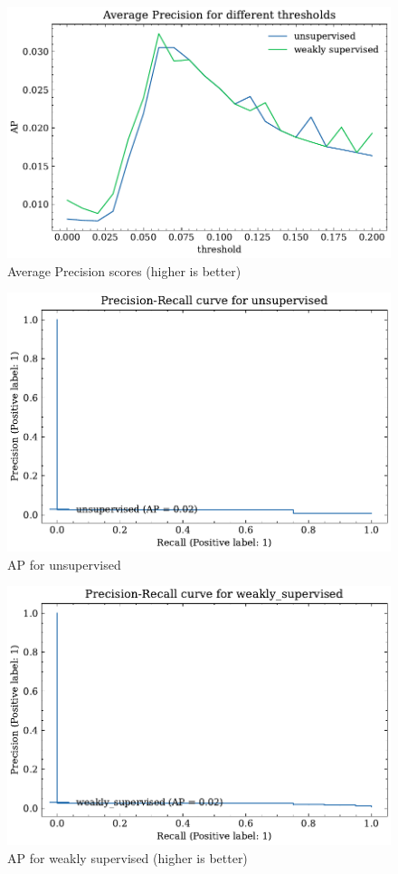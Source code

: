 \begin{figure}[htbp]
  \centering
  \includegraphics{5Results/figs/bsle/average_precision_score_for_thresholds.pdf}
  \caption{Average Precision scores (higher is better)}
\end{figure}
\begin{figure}[htbp]
  \centering
  \includegraphics{5Results/figs/bsle/pr_auc_unsupervised.pdf}
  \caption{AP for unsupervised}
\end{figure}
\begin{figure}[htbp]
  \centering
  \includegraphics{5Results/figs/bsle/pr_auc_weakly_supervised.pdf}
  \caption{AP for weakly supervised (higher is better)}
\end{figure}
